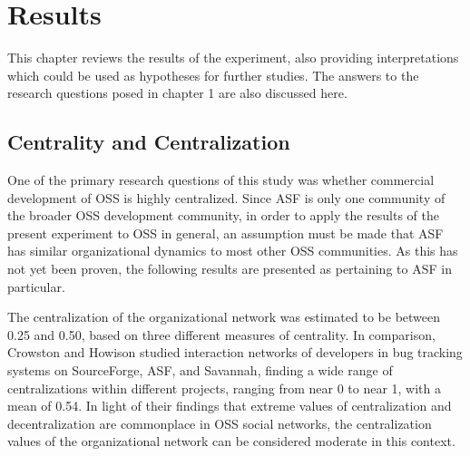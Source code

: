 \chapter{Results}
This chapter reviews the results of the experiment, also providing interpretations which could be used as hypotheses for further studies. The answers to the research questions posed in chapter 1 are also discussed here.

\section{Centrality and Centralization}
One of the primary research questions of this study was whether commercial development of OSS is highly centralized. Since ASF is only one community of the broader OSS development community, in order to apply the results of the present experiment to OSS in general, an assumption must be made that ASF has similar organizational dynamics to most other OSS communities. As this has not yet been proven, the following results are presented as pertaining to ASF in particular.

The centralization of the organizational network was estimated to be between 0.25 and 0.50, based on three different measures of centrality. In comparison, Crowston and Howison\cite{Crowston2006} studied interaction networks of developers in bug tracking systems on SourceForge, ASF, and Savannah, finding a wide range of centralizations within different projects, ranging from near 0 to near 1, with a mean of 0.54. In light of their findings that extreme values of centralization and decentralization are commonplace in OSS social networks, the centralization values of the organizational network can be considered moderate in this context.